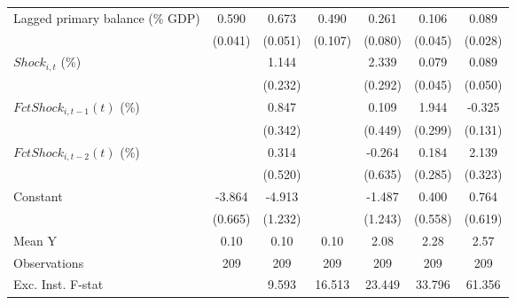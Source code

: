 {\begin{tabular}{l*{6}{c}}
\addlinespace
Lagged primary balance (\% GDP)&       0.590\sym{***}&       0.673\sym{***}&       0.490\sym{***}&       0.261\sym{***}&       0.106\sym{**} &       0.089\sym{***}\\
                    &     (0.041)         &     (0.051)         &     (0.107)         &     (0.080)         &     (0.045)         &     (0.028)         \\
\addlinespace
$ Shock_{i,t}$ (\%) &                     &       1.144\sym{***}&                     &       2.339\sym{***}&       0.079         &       0.089\sym{*}  \\
                    &                     &     (0.232)         &                     &     (0.292)         &     (0.045)         &     (0.050)         \\
\addlinespace
$ FctShock_{i,t-1}(t)$ (\%)&                     &       0.847\sym{**} &                     &       0.109         &       1.944\sym{***}&      -0.325\sym{**} \\
                    &                     &     (0.342)         &                     &     (0.449)         &     (0.299)         &     (0.131)         \\
\addlinespace
$ FctShock_{i,t-2}(t)$ (\%)&                     &       0.314         &                     &      -0.264         &       0.184         &       2.139\sym{***}\\
                    &                     &     (0.520)         &                     &     (0.635)         &     (0.285)         &     (0.323)         \\
\addlinespace
Constant            &      -3.864\sym{***}&      -4.913\sym{***}&                     &      -1.487         &       0.400         &       0.764         \\
                    &     (0.665)         &     (1.232)         &                     &     (1.243)         &     (0.558)         &     (0.619)         \\
\midrule
Mean Y              &        0.10         &        0.10         &        0.10         &        2.08         &        2.28         &        2.57         \\
Observations        &         209         &         209         &         209         &         209         &         209         &         209         \\
Exc. Inst. F-stat   &                     &       9.593         &      16.513         &      23.449         &      33.796         &      61.356         \\
\bottomrule
\end{tabular}
}
